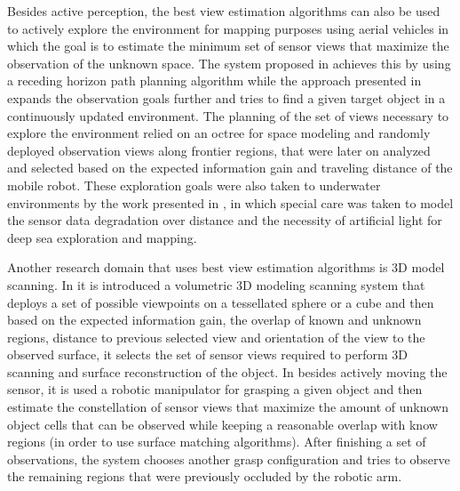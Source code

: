 Besides active perception, the best view estimation algorithms can also be used to actively explore the environment for mapping purposes using aerial vehicles in which the goal is to estimate the minimum set of sensor views that maximize the observation of the unknown space. The system proposed in \cite{Bircher2016} achieves this by using a receding horizon path planning algorithm while the approach presented in \cite{Gedicke2016} expands the observation goals further and tries to find a given target object in a continuously updated environment. The planning of the set of views necessary to explore the environment relied on an octree for space modeling and randomly deployed observation views along frontier regions, that were later on analyzed and selected based on the expected information gain and traveling distance of the mobile robot. These exploration goals were also taken to underwater environments by the work presented in \cite{Sheinin2016}, in which special care was taken to model the sensor data degradation over distance and the necessity of artificial light for deep sea exploration and mapping.

Another research domain that uses best view estimation algorithms is 3D model scanning. In \cite{Irving2014} it is introduced a volumetric 3D modeling scanning system that deploys a set of possible viewpoints on a tessellated sphere or a cube and then based on the expected information gain, the overlap of known and unknown regions, distance to previous selected view and orientation of the view to the observed surface, it selects the set of sensor views required to perform 3D scanning and surface reconstruction of the object.
In \cite{Krainin2011} besides actively moving the sensor, it is used a robotic manipulator for grasping a given object and then estimate the constellation of sensor views that maximize the amount of unknown object cells that can be observed while keeping a reasonable overlap with know regions (in order to use surface matching algorithms). After finishing a set of observations, the system chooses another grasp configuration and tries to observe the remaining regions that were previously occluded by the robotic arm.

